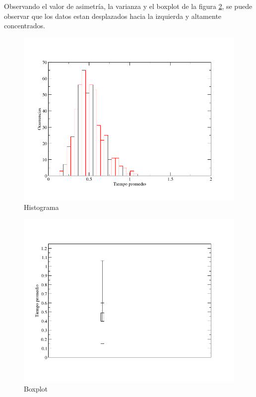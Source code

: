 \documentclass[10pt,a4paper]{article}
\begin{document}
Observando el valor de asimetr\'ia, la varianza y el boxplot de la figura \ref{boxplot}, 
se puede observar que los datos estan desplazados hacia la izquierda y altamente concentrados.


\begin{figure}
  \centering
  \includegraphics[scale=0.5]{histogram.png} 
  \caption{Histograma}
  \label{histogram}
\end{figure}

\begin{figure}
  \centering
  \includegraphics[scale=0.5]{boxplot.png} 
  \caption{Boxplot}
  \label{boxplot}
\end{figure}
\end{document}
